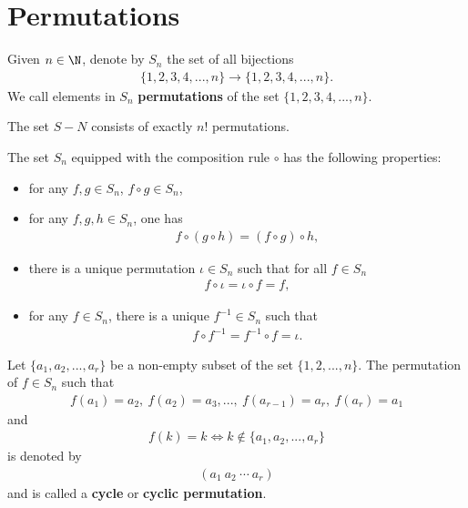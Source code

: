 \documentclass{article}
\begin{document}
\section{Permutations}
\begin{definition}
	Given $n\in\N$, denote by $S_n$ the set of all bijections
	\begin{align*}
		\{1,2,3,4,...,n\}\to\{1,2,3,4,...,n\}.
	\end{align*}
	We call elements in $S_n$ \textbf{permutations} of the set $\{1,2,3,4,...,n\}$.
\end{definition}
\begin{lemma}
	The set $S-N$ consists of exactly $n!$ permutations.
\end{lemma}
\begin{lemma}
	The set $S_n$ equipped with the composition rule $\circ$ has the following properties:
	\begin{itemize}
		\item for any $f,g\in S_n$, $f\circ g\in S_n$,
		\item for any $f,g,h\in S_n$, one has
		      \begin{align*}
			      f\circ \left(g\circ h\right)=\left(f\circ g\right)\circ h,
		      \end{align*}
		\item there is a unique permutation $\iota \in S_n$ such that for all $f\in S_n$
		      \begin{align*}
			      f\circ \iota = \iota \circ f = f,
		      \end{align*}
		\item for any $f\in S_n$, there is a unique $f^{-1}\in S_n$ such that
		      \begin{align*}
			      f\circ f^{-1}=f^{-1}\circ f = \iota.
		      \end{align*}
	\end{itemize}
\end{lemma}
\begin{definition}
	Let $\{a_1, a_2, ...,a_r\}$ be a non-empty subset of the set $\{1,2,...,n\}$. The permutation of $f\in S_n$ such that
	\begin{align*}
		f(a_1)=a_2,\: f(a_2)=a_3,...,\: f(a_{r-1})=a_r,\: f(a_r)=a_1
	\end{align*}
	and
	\begin{align*}
		f(k)=k \Leftrightarrow k\not\in \{a_1,a_2,...,a_r\}
	\end{align*}
	is denoted by
	\begin{align*}
		(a_1\:a_2\:\cdots\:a_r)
	\end{align*}
	and is called a \textbf{cycle} or \textbf{cyclic permutation}.
\end{definition}
\end{document}
